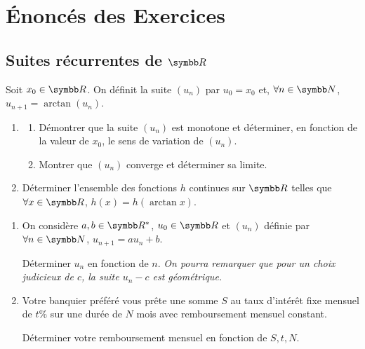 \section{Énoncés des Exercices}

\subsection{Suites récurrentes de \texorpdfstring{$\R$}{R}}

\begin{exercice}
    Soit $x_{0}\in\R$. On définit la suite $(u_{n})$ par $u_{0}=x_{0}$ et, $\forall n\in\N$, $u_{n+1}=\arctan(u_{n}).$
    \begin{enumerate}
        \item 
        \begin{enumerate}
            \item Démontrer que la suite $(u_{n})$ est monotone et déterminer, en fonction de la valeur de $x_{0}$, le sens de variation de $(u_{n})$.
            \item Montrer que $(u_{n})$ converge et déterminer sa limite.
        \end{enumerate}
        \item Déterminer l'ensemble des fonctions $h$ continues sur $\R$ telles que $\forall x\in\R$, $h(x)=h(\arctan x)$.
    \end{enumerate}
\end{exercice}

\begin{exercice}
\begin{enumerate}
    \item On considère $a, b\in\R^{*}$, $u_{0}\in\R$ et $(u_{n})$ définie par $\forall n\in\N$, $u_{n+1}=au_{n}+b$.

    Déterminer $u_{n}$ en fonction de $n$.
    \textit{On pourra remarquer que pour un choix judicieux de $c$, la suite $u_{n}-c$ est géométrique.}

    \item 
        Votre banquier préféré vous prête une somme $S$ au taux d'intérêt fixe mensuel de $t\%$ sur une durée de $N$ mois avec remboursement mensuel constant.

        Déterminer votre remboursement mensuel en fonction de $S, t, N$.
\end{enumerate}
\end{exercice}

